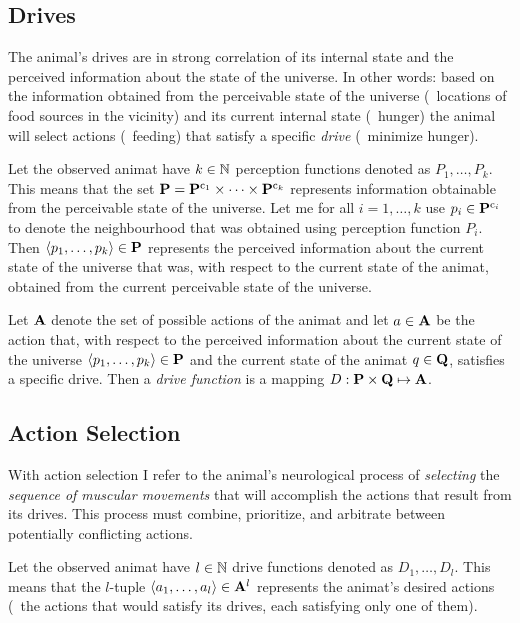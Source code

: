 \subsection{Drives}
The animal's drives are in strong correlation of its internal state and the perceived information about the state of the universe. In other words: based on the information obtained from the perceivable state of the universe (\eg\ locations of food sources in the vicinity) and its current internal state (\eg\ hunger) the animal will select actions (\eg\ feeding) that satisfy a specific \emph{drive} (\eg\ minimize hunger).

Let the observed animat have $k \in \mathbb{N}$ perception functions denoted as $P_1,\ldots,P_k$. This means that the set ${\mathbf{P}}={\mathbf{P}}^{\mathrm{c}_1} \times \cdots \times {\ensuremath{\mathbf{P}}}^{\mathrm{c}_k}$ represents information obtainable from the perceivable state of the universe. Let me for all $i=1,\ldots,k$ use $p_i \in  {\ensuremath{\mathbf{P}}}^{\mathrm{c}_i}$ to denote the neighbourhood that was obtained using perception function $P_i$. Then $\langle p_1,\ldots,p_k\rangle \in {\ensuremath{\mathbf{P}}}$ represents the perceived information about the current state of the universe that was, with respect to the current state of the animat, obtained from the current perceivable state of the universe. 

\begin{defn}
\label{def:animat:Dj}
Let ${\mathbf{A}}$ denote the set of possible actions of the animat and let $a \in {\ensuremath{\mathbf{A}}}$ be the action that, with respect to the perceived information about the current state of the universe $\langle p_1,\ldots,p_k\rangle \in {\ensuremath{\mathbf{P}}}$ and the current state of the animat $q \in {\ensuremath{\mathbf{Q}}}$, satisfies a specific drive. Then a \emph{drive function} is a mapping $D: {\mathbf{P}} \times {\ensuremath{\mathbf{Q}}} \mapsto {\ensuremath{\mathbf{A}}}$.
\end{defn}

\subsection{Action Selection}
With action selection I refer to the animal's neurological process of \emph{selecting} the \emph{sequence of muscular movements} that will accomplish the actions that result from its drives. This process must combine, prioritize, and arbitrate between potentially conflicting actions. 

Let the observed animat have $l \in \mathbb{N}$ drive functions denoted as $D_1,\ldots,D_l$. This means that the $l$-tuple $\langle a_1,\ldots,a_l\rangle \in {\ensuremath{\mathbf{A}}}^l$ represents the animat's desired actions (\ie\ the actions that would satisfy its drives, each satisfying only one of them). 

